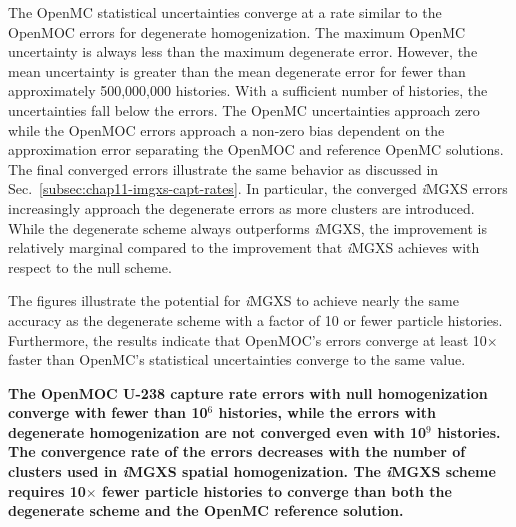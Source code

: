 The OpenMC statistical uncertainties converge at a rate similar to the OpenMOC errors for degenerate homogenization. The maximum OpenMC uncertainty is always less than the maximum degenerate error. However, the mean uncertainty is greater than the mean degenerate error for fewer than approximately 500,000,000 histories. With a sufficient number of histories, the uncertainties fall below the errors. The OpenMC uncertainties approach zero while the OpenMOC errors approach a non-zero bias dependent on the approximation error separating the OpenMOC and reference OpenMC solutions. The final converged errors illustrate the same behavior as discussed in Sec.~\ref{subsec:chap11-imgxs-capt-rates}. In particular, the converged \textit{i}\ac{MGXS} errors increasingly approach the degenerate errors as more clusters are introduced. While the degenerate scheme always outperforms \textit{i}\ac{MGXS}, the improvement is relatively marginal compared to the improvement that \textit{i}\ac{MGXS} achieves with respect to the null scheme. 

The figures illustrate the potential for \textit{i}\ac{MGXS} to achieve nearly the same accuracy as the degenerate scheme with a factor of 10 or fewer particle histories. Furthermore, the results indicate that OpenMOC's errors converge at least 10$\times$ faster than OpenMC's statistical uncertainties converge to the same value.

\begin{emphbox}
\textbf{The OpenMOC U-238 capture rate errors with null homogenization converge with fewer than 10$^{6}$ histories, while the errors with degenerate homogenization are not converged even with 10$^{9}$ histories. The convergence rate of the errors decreases with the number of clusters used in \textit{i}\ac{MGXS} spatial homogenization. The \textit{i}\ac{MGXS} scheme requires 10$\times$ fewer particle histories to converge than both the degenerate scheme and the OpenMC reference solution.}
\end{emphbox}


